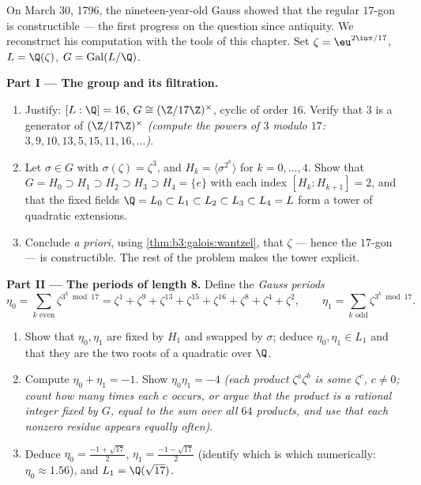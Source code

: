 \begin{problem}\label{pb:b3:galois:1}
On March 30, 1796, the nineteen-year-old Gauss showed that the
regular $17$-gon is constructible --- the first progress on the
question since antiquity. We reconstruct his computation with the
tools of this chapter. Set $\zeta = \eu^{2\iu\pi/17}$, $L =
\Q(\zeta)$, $G = \operatorname{Gal}(L/\Q)$.

\medskip
\noindent\textbf{Part I --- The group and its filtration.}
\begin{enumerate}
  \item Justify: $[L:\Q] = 16$, $G \cong (\Z/17\Z)^\times$,
        cyclic of order $16$. Verify that $3$ is a generator of
        $(\Z/17\Z)^\times$ \emph{(compute the powers of $3$
        modulo $17$: $3, 9, 10, 13, 5, 15, 11, 16, \dots$)}.
  \item Let $\sigma \in G$ with $\sigma(\zeta) = \zeta^3$, and
        $H_k = \langle \sigma^{2^k}\rangle$ for $k = 0, \dots,
        4$. Show that $G = H_0 \supset H_1 \supset H_2 \supset
        H_3 \supset H_4 = \{e\}$ with each index $[H_k :
        H_{k+1}] = 2$, and that the fixed fields $\Q = L_0
        \subset L_1 \subset L_2 \subset L_3 \subset L_4 = L$
        form a tower of quadratic extensions.
  \item Conclude \emph{a priori}, using
        \cref{thm:b3:galois:wantzel}, that $\zeta$ --- hence the
        $17$-gon --- is constructible. The rest of the problem
        makes the tower explicit.
\end{enumerate}

\medskip
\noindent\textbf{Part II --- The periods of length 8.}
Define the \emph{Gauss periods}
\[
\eta_0 = \sum_{k \text{ even}} \zeta^{3^k \bmod 17}
= \zeta^{1} + \zeta^{9} + \zeta^{13} + \zeta^{15} + \zeta^{16} +
\zeta^{8} + \zeta^{4} + \zeta^{2},
\qquad
\eta_1 = \sum_{k \text{ odd}} \zeta^{3^k \bmod 17}.
\]
\begin{enumerate}[resume]
  \item Show that $\eta_0, \eta_1$ are fixed by $H_1$ and swapped
        by $\sigma$; deduce $\eta_0, \eta_1 \in L_1$ and that
        they are the two roots of a quadratic over $\Q$.
  \item Compute $\eta_0 + \eta_1 = -1$. Show $\eta_0\eta_1 = -4$
        \emph{(each product $\zeta^a\zeta^b$ is some $\zeta^c$,
        $c \neq 0$; count how many times each $c$ occurs, or
        argue that the product is a rational integer fixed by
        $G$, equal to the sum over all $64$ products, and use
        that each nonzero residue appears equally often)}.
  \item Deduce $\eta_0 = \frac{-1 + \sqrt{17}}2$, $\eta_1 =
        \frac{-1-\sqrt{17}}2$ (identify which is which
        numerically: $\eta_0 \approx 1.56$), and $L_1 =
        \Q(\sqrt{17})$.
\end{enumerate}


\end{problem}
